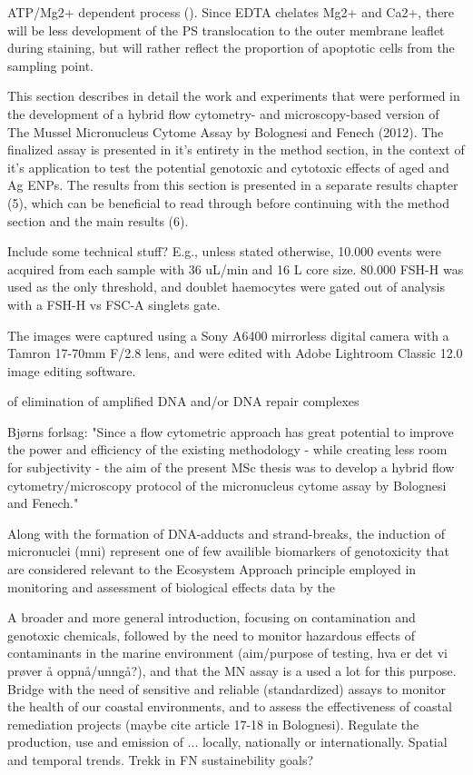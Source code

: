 ATP/Mg2+ dependent process (\cite{Connor1992}). Since EDTA chelates Mg2+ and Ca2+, there will be less development of the PS translocation to the outer membrane leaflet during staining, but will rather reflect the proportion of apoptotic cells from the sampling point.

This section describes in detail the work and experiments that were performed in the development of a hybrid flow cytometry- and microscopy-based version of The Mussel Micronucleus Cytome Assay by Bolognesi and Fenech (2012). The finalized assay is presented in it's entirety in the method section, in the context of it's application to test the potential genotoxic and cytotoxic effects of aged  and Ag \acrshort{ENPs}. The results from this section is presented in a separate results chapter (5), which can be beneficial to read through before continuing with the method section and the main results (6).

Include some technical stuff? E.g., unless stated otherwise, 10.000 events were acquired from each sample with 36 uL/min and 16 \micro L core size. 80.000 FSH-H was used as the only threshold, and doublet haemocytes were gated out of analysis with a FSH-H vs FSC-A singlets gate.

The images were captured using a Sony A6400 mirrorless digital camera with a Tamron 17-70mm F/2.8 lens, and were edited with Adobe\textsuperscript{\textregistered} Lightroom Classic 12.0 image editing software.

of elimination of amplified DNA and/or DNA repair complexes

Bjørns forlsag: "Since a flow cytometric approach has great potential to improve the power and efficiency of the existing methodology - while creating less room for subjectivity - the aim of the present MSc thesis was to develop a hybrid flow cytometry/microscopy protocol of the micronucleus cytome assay by Bolognesi and Fenech."

Along with the formation of DNA-adducts and strand-breaks, the induction of micronuclei (\acrshort{mni}) represent one of few availible biomarkers of genotoxicity that are considered relevant to the Ecosystem Approach principle employed in monitoring and assessment of biological effects data by the

A broader and more general introduction, focusing on contamination and genotoxic chemicals, followed by the need to monitor hazardous effects of contaminants in the marine environment (aim/purpose of testing, hva er det vi prøver å oppnå/unngå?), and that the MN assay is a used a lot for this purpose. Bridge with the need of sensitive and reliable (standardized) assays to monitor the health of our coastal environments, and to assess the effectiveness of coastal remediation projects (maybe cite article 17-18 in Bolognesi). Regulate the production, use and emission of ... locally, nationally or internationally. Spatial and temporal trends. Trekk in FN sustainebility goals?


